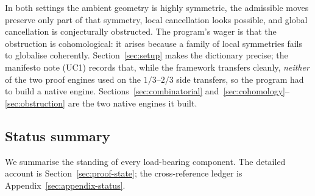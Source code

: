 In both settings the ambient geometry is highly symmetric, the
admissible moves preserve only part of that symmetry, local
cancellation looks possible, and global cancellation is conjecturally
obstructed. The program's wager is that the obstruction is
cohomological: it arises because a family of local symmetries fails to
globalise coherently. Section~\ref{sec:setup} makes the dictionary
precise; the manifesto note (UC1) records that, while the framework
transfers cleanly, \emph{neither} of the two proof engines used on the
$1/3$--$2/3$ side transfers, so the program had to build a native
engine. Sections~\ref{sec:combinatorial}
and~\ref{sec:cohomology}--\ref{sec:obstruction} are the two native
engines it built.

\subsection{Status summary}
\label{ssec:status-summary}

We summarise the standing of every load-bearing component. The
detailed account is Section~\ref{sec:proof-state}; the cross-reference
ledger is Appendix~\ref{sec:appendix-status}.

